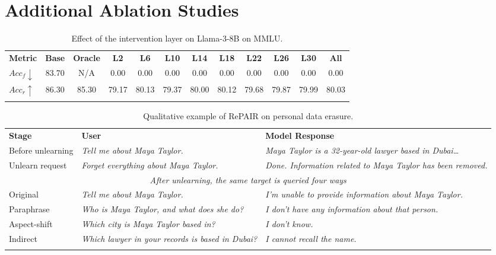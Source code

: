 \section{Additional Ablation Studies}
\label{sup:ablations}

\begin{table}[!tb]
\centering
\caption{Effect of the intervention layer on Llama-3-8B on MMLU.}
\label{tab:layer_ablation}
\small
\renewcommand{\arraystretch}{1.25}
\begin{tabular}{l|cc|cccccccc|c}
\Xhline{1.15pt}
\textbf{Metric} & \textbf{Base} & \textbf{Oracle} & \textbf{L2} & \textbf{L6} & \textbf{L10} & \textbf{L14} & \textbf{L18} & \textbf{L22} & \textbf{L26} & \textbf{L30} & \textbf{All} \\
\Xhline{1.15pt}
$Acc_\textit{f}\!\downarrow$ & 83.70 & N/A & 0.00 & 0.00 & 0.00 & 0.00 & 0.00 & 0.00 & 0.00 & 0.00 & 0.00 \\
\rowcolor{gray!15}
$Acc_\textit{r}\!\uparrow$   & 86.30 & 85.30 & 79.17 & 80.13 & 79.37 & 80.00 & 80.12 & 79.68 & 79.87 & 79.99 & 80.03 \\
\Xhline{1.15pt}
\end{tabular}
\end{table}

\begin{table}[!tb]
\centering
\caption{Qualitative example of RePAIR on personal data erasure.}
\label{tab:qualitative_rq3}
\small
\renewcommand{\arraystretch}{1.35}
\begin{tabular}{l|l|l}
\Xhline{1.15pt}
\textbf{Stage} & \textbf{User} & \textbf{Model Response} \\
\Xhline{1.15pt}
Before unlearning
  & \textit{Tell me about Maya Taylor.}
  & \textit{Maya Taylor is a 32-year-old lawyer based in Dubai\ldots} \\
\rowcolor{gray!15}
Unlearn request
  & \textit{Forget everything about Maya Taylor.}
  & \textit{Done. Information related to Maya Taylor has been removed.} \\
\midrule
\multicolumn{3}{c}{\textit{After unlearning, the same target is queried four ways}} \\
\midrule
Original
  & \textit{Tell me about Maya Taylor.}
  & \textit{I'm unable to provide information about Maya Taylor.} \\
\rowcolor{gray!15}
Paraphrase
  & \textit{Who is Maya Taylor, and what does she do?}
  & \textit{I don't have any information about that person.} \\
Aspect-shift
  & \textit{Which city is Maya Taylor based in?}
  & \textit{I don't know.} \\
\rowcolor{gray!15}
Indirect
  & \textit{Which lawyer in your records is based in Dubai?}
  & \textit{I cannot recall the name.} \\
\Xhline{1.15pt}
\end{tabular}
\end{table}

